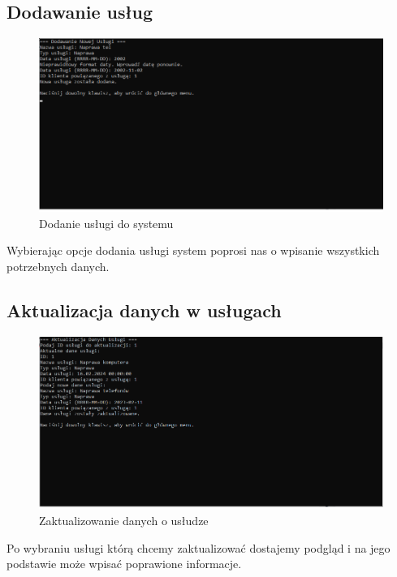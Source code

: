 \subsection{Dodawanie usług}
\begin{figure}[h]
    \centering
    \includegraphics[width=\textwidth]{DodawanieUslug.png}
      \caption{Dodanie usługi do systemu}
    \label{fig:example}
\end{figure}

\newpage
Wybierając opcje dodania usługi system poprosi nas o wpisanie wszystkich potrzebnych danych.

\subsection{Aktualizacja danych w usługach}
\begin{figure}[h]
    \centering
    \includegraphics[width=\textwidth]{AktualizacjaDanychUslug.png}
      \caption{Zaktualizowanie danych o usłudze}
    \label{fig:example}
\end{figure}

Po wybraniu usługi którą chcemy zaktualizować dostajemy podgląd i na jego podstawie może wpisać poprawione informacje. 




